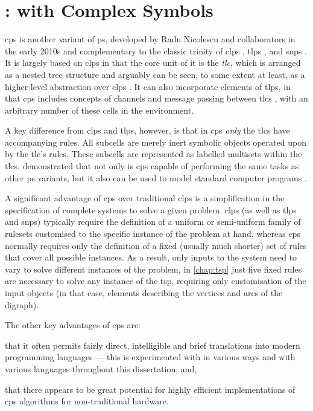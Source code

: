 \chapter{\label{chap:cpsystems}:  with Complex Symbols}

\gls{cps} is another variant of \gls{ps}, developed by Radu Nicolescu and collaborators in the early 2010s and complementary to the classic trinity of \gls{clps} \cite{Paun2000}, \gls{tlps} \cite{Martin-Vide2003}, and \gls{snps} \cite{Ionescu2006}.  It is largely based on \gls{clps} in that the core unit of it is the \emph{\gls{tlc}}, which is arranged as a nested tree structure and arguably can be seen, to some extent at least, as a higher-level abstraction over \gls{clps} \cite{Nicolescu2018}.  It can also incorporate elements of \gls{tlps}, in that \gls{cps} includes concepts of channels and message passing between \glspl{tlc} \cite{Henderson2019}, with an arbitrary number of these cells in the environment.  

A key difference from \gls{clps} and \gls{tlps}, however, is that in \gls{cps} \emph{only} the \glspl{tlc} have accompanying rules.  All subcells are merely inert symbolic objects operated upon by the \gls{tlc}'s rules.  These subcells are represented as labelled multisets within the \glspl{tlc}.  \citeauthor{Nicolescu2014a} demonstrated that not only is \gls{cps} capable of performing the same tasks as other \gls{ps} variants, but it also can be used to model standard computer programs \cite{Nicolescu2014a}.

A significant advantage of \gls{cps} over traditional \gls{clps} is a simplification in the specification of complete systems to solve a given problem.  \Gls{clps} (as well as \gls{tlps} and \gls{snps}) typically require the definition of a uniform or semi-uniform family of \glspl{ruleset} customised to the specific instance of the problem at hand, whereas \gls{cps} normally requires only the definition of a fixed (usually much shorter) set of rules that cover all possible instances. As a result, only inputs to the system need to vary to solve different instances of the problem, \eg{} in \cref{chap:tsp} just five fixed rules are necessary to solve any instance of the \gls{tsp}, requiring only customisation of the input objects (in that case, elements describing the vertices and arcs of the digraph).

The other key advantages of \gls{cps} are:
\begin{inparaenum}[a)]
\item that it often permits fairly direct, intelligible and brief translations into modern programming languages --- this is experimented with in various ways and with various languages throughout this dissertation; and,
\item that there appears to be great potential for highly efficient implementations of \gls{cps} algorithms for non-traditional hardware.
\end{inparaenum}


